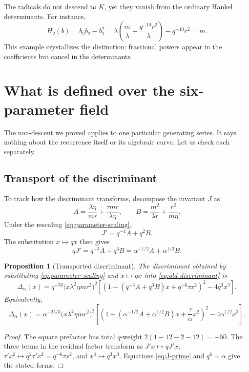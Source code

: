 \documentclass[11pt]{article}
\newtheorem{proposition}[theorem]{Proposition}
\theoremstyle{definition}
\theoremstyle{remark}
\begin{document}
The radicals do not descend to $K$, yet they vanish from the ordinary Hankel
determinants. For instance,
\[
 H_2(b)=b_0b_2-b_1^2
 =\lambda\left(\frac{m}{\lambda}+\frac{q^{-10}r^2}{\lambda}\right)-q^{-10}r^2=m.
\]
This example crystallizes the distinction: fractional powers appear in the
coefficients but cancel in the determinants.

\section{What is defined over the six-parameter field}
The non-descent we proved applies to one particular generating series. It says
nothing about the recurrence itself or its algebraic curve. Let us check each
separately.

\subsection{Transport of the discriminant}
To track how the discriminant transforms, decompose the invariant $J$ as
\begin{equation}
 A=\frac{\lambda\eta}{mr}+\frac{\tau mr}{\lambda\eta},
 \qquad
 B=\frac{m^2}{\lambda r}+\frac{r^2}{m\eta}.
 \label{eq:A-B}
\end{equation}
Under the rescaling \eqref{eq:parameter-scaling},
\begin{equation}
 J'=q^{-4}A+q^2B.
 \label{eq:J-prime}
\end{equation}
The substitution $x\mapsto qx$ then gives
\begin{equation}
 qJ'=q^{-3}A+q^3B
 =\alpha^{-1/2}A+\alpha^{1/2}B.
 \label{eq:J-alpha}
\end{equation}

\begin{proposition}[Transported discriminant]
The discriminant obtained by substituting
\eqref{eq:parameter-scaling} and $x\mapsto qx$ into
\eqref{eq:old-discriminant} is
\begin{equation}
 \Delta_\alpha(x)
 =q^{-50}\bigl(x\lambda^2\eta m r^2\bigr)^2
 \left[
  \left(1-(q^{-3}A+q^3B)x+q^{-6}\tau x^2\right)^2
  -4q^3x^3
 \right].
 \label{eq:q-discriminant}
\end{equation}
Equivalently,
\begin{equation}
 \Delta_\alpha(x)
 =\alpha^{-25/3}\bigl(x\lambda^2\eta m r^2\bigr)^2
 \left[
  \left(1-(\alpha^{-1/2}A+\alpha^{1/2}B)x
             +\frac{\tau}{\alpha}x^2\right)^2
  -4\alpha^{1/2}x^3
 \right].
 \label{eq:alpha-discriminant}
\end{equation}
\end{proposition}
\begin{proof}
The square prefactor has total $q$-weight
$2(1-12-2-12)=-50$.  The three terms in the residual factor transform as
$J'x\mapsto qJ'x$, $\tau'x^2\mapsto q^2\tau'x^2=q^{-6}\tau x^2$, and
$x^3\mapsto q^3x^3$.  Equations \eqref{eq:J-prime} and $q^6=\alpha$ give the
stated forms.
\end{proof}
\end{document}
